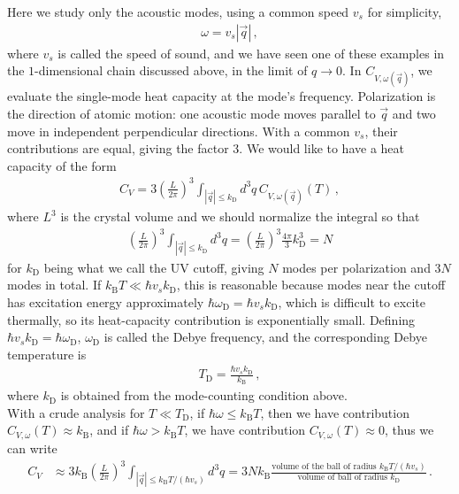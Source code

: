 \documentclass[11pt, oneside]{book}
\theoremstyle{break}
\theoremstyle{break}
\begin{document}
Here we study only the acoustic modes, using a common speed $v_s$ for simplicity, 
\begin{align*}
\omega = v_s |\vec{q}|\,,
\end{align*} 
where $v_s$ is called the speed of sound, and we have seen one of these examples in the $1$-dimensional chain discussed above, in the limit of $q \to 0$. In $C_{V,\omega(\vec{q})}$, we evaluate the single-mode heat capacity at the mode's frequency. Polarization is the direction of atomic motion: one acoustic mode moves parallel to $\vec{q}$ and two move in independent perpendicular directions. With a common $v_s$, their contributions are equal, giving the factor $3$. We would like to have a heat capacity of the form 
\begin{align*}
C_V = 3\left(\frac{L}{2\pi}\right)^3 \int_{|\vec{q}|\leq k_{\text{D}}} d^3q\, C_{V,\omega(\vec{q})} (T)\,,
\end{align*}
where $L^3$ is the crystal volume and we should normalize the integral so that 
\begin{align*}
\left(\frac{L}{2\pi}\right)^3 \int_{|\vec{q}|\leq k_{\text{D}}} d^3q =\left(\frac{L}{2\pi}\right)^3 \frac{4\pi}{3}k_{\text{D}}^3 = N
\end{align*}
for $k_{\text{D}}$ being what we call the UV cutoff, giving $N$ modes per polarization and $3N$ modes in total. If $k_{\text{B}}T \ll \hbar v_s k_{\text{D}}$, this is reasonable because modes near the cutoff has excitation energy approximately
$\hbar\omega_{\mathrm D}=\hbar v_s k_{\mathrm D}$, which is difficult to excite thermally, so its heat-capacity contribution is exponentially small. Defining $\hbar v_s k_{\text{D}} = \hbar\omega_{\text{D}}$, $\omega_{\text{D}}$ is called the Debye frequency, and the corresponding Debye temperature is
\begin{align*}
T_\text{D} = \frac{\hbar v_s k_{\text{D}}}{k_{\text{B}}}\,,
\end{align*}
where $k_{\text{D}}$ is obtained from the mode-counting condition above. \\

With a crude analysis for $T\ll T_{\text{D}}$, if $\hbar\omega \leq k_{\text{B}}T$, then we have contribution $C_{V,\omega}(T) \approx k_{\text{B}}$, and if $\hbar\omega > k_{\text{B}} T$, we have contribution $C_{V,\omega}(T) \approx 0$, thus we can write 
\begin{align*}
C_V &\approx 3k_{\text{B}}\left(\frac{L}{2\pi}\right)^3 \int_{|\vec{q}| \leq k_{\text{B}}T/(\hbar v_s)} d^3q 
= 3Nk_{\text{B}}\frac{\text{volume of the ball of radius }k_{\text{B}}T/(\hbar v_s)}{\text{volume of ball of radius } k_{\text{D}}}\,.
\end{align*}
\end{document}

